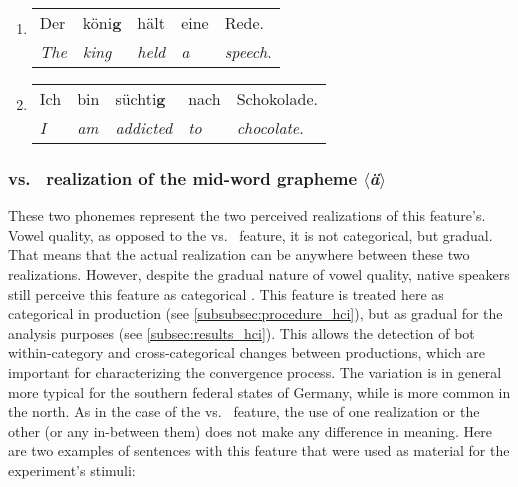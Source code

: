 \begin{enumerate}[label=\arabic{enumi}\alph*), ref=\arabic{enumi}\alph*.)]
	\item 
	\begin{tabulary}{\linewidth}{LLLLL}
		Der				   & köni\textbf{\underline{g}} & hält				  & 	eine	  & Rede.\\
		\textit{The}	& \textit{king} 			         & \textit{held}	& \emph{a}  & \emph{speech}.\\
	\end{tabulary}
	\item
	\begin{tabulary}{\linewidth}{LLLLL}
		Ich 		 & bin		      & süchti\textbf{\underline{g}} & nach 		  & Schokolade.\\
		\textit{I}  & \textit{am} & \textit{addicted} 			       & \textit{to}    & \textit{chocolate}.\\
	\end{tabulary}
\end{enumerate}
	
\subsubsection*{\textipa{[e:]} vs.\ \textipa{[E:]} realization of the mid-word grapheme $\langle$\textit{ä}$\rangle$}
	
These two phonemes represent the two perceived realizations of this feature's.
Vowel quality, as opposed to the \textipa{[\c{c}]} vs.\ \textipa{[k]} feature, it is not categorical, but gradual.
That means that the actual realization can be anywhere between these two realizations.
However, despite the gradual nature of vowel quality, native speakers still perceive this feature as categorical \citep[either \textipa{[e:]} or \textipa{[E:]}, cf.][]{Kuhl2004early, Kuhl1991human}.
This feature is treated here as categorical in production (see \cref{subsubsec:procedure_hci}), but as gradual for the analysis purposes (see \cref{subsec:results_hci}).
This allows the detection of bot within-category and cross-categorical changes between productions, which are important for characterizing the convergence process.
The \textipa{[E:]} variation is in general more typical for the southern federal states of Germany, while \textipa{[e:]} is more common in the north.
As in the case of the \textipa{[\c{c}]} vs.\ \textipa{[k]} feature, the use of one realization or the other (or any in-between them) does not make any difference in meaning.
Here are two examples of sentences with this feature that were used as material for the experiment's stimuli:
	
